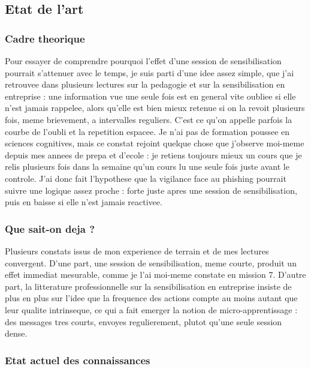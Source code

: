 \documentclass[11pt,a4paper]{article}
\begin{document}
\subsection{Etat de l'art}

\subsubsection*{Cadre theorique}

Pour essayer de comprendre pourquoi l'effet d'une session de sensibilisation pourrait s'attenuer avec le temps, je suis parti d'une idee assez simple, que j'ai retrouvee dans plusieurs lectures sur la pedagogie et sur la sensibilisation en entreprise : une information vue une seule fois est en general vite oubliee si elle n'est jamais rappelee, alors qu'elle est bien mieux retenue si on la revoit plusieurs fois, meme brievement, a intervalles reguliers. C'est ce qu'on appelle parfois la courbe de l'oubli et la repetition espacee. Je n'ai pas de formation poussee en sciences cognitives, mais ce constat rejoint quelque chose que j'observe moi-meme depuis mes annees de prepa et d'ecole : je retiens toujours mieux un cours que je relis plusieurs fois dans la semaine qu'un cours lu une seule fois juste avant le controle. J'ai donc fait l'hypothese que la vigilance face au phishing pourrait suivre une logique assez proche : forte juste apres une session de sensibilisation, puis en baisse si elle n'est jamais reactivee.

\subsubsection*{Que sait-on deja ?}

Plusieurs constats issus de mon experience de terrain et de mes lectures convergent. D'une part, une session de sensibilisation, meme courte, produit un effet immediat mesurable, comme je l'ai moi-meme constate en mission 7. D'autre part, la litterature professionnelle sur la sensibilisation en entreprise insiste de plus en plus sur l'idee que la frequence des actions compte au moins autant que leur qualite intrinseque, ce qui a fait emerger la notion de \guillemotleft micro-apprentissage \guillemotright : des messages tres courts, envoyes regulierement, plutot qu'une seule session dense.

\subsubsection*{Etat actuel des connaissances}
\end{document}
